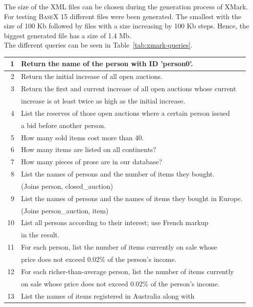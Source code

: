 The size of the XML files can be chosen during the generation process of XMark.
For testing \textsc{BaseX} 15 different files were been generated.
The smallest with the size of 100 Kb followed by files with a size increasing by 100 Kb steps.
Hence, the biggest generated file has a size of 1.4 Mb.\\
The different queries can be seen in Table~\ref{tab:xmark-queries}.
\begin {table}[htpb] 
  \centering
	\begin{tabular}{r|l}
	  \hline
	  1&Return the name of the person with ID 'person0'.\\
	  \hline
	  2&Return the initial increase of all open auctions.\\
	  \hline
	  3&Return the first and current increase of all open auctions whose current\\
	  &increase is at least twice as high as the initial increase.\\
	  \hline
	  4&List the reserves of those open auctions where a certain person issued\\
	  &a bid before another person.\\
	  \hline
	  5&How many sold items cost more than 40.\\
	  \hline
	  6&How many items are listed on all continents?\\
	  \hline
	  7&How many pieces of prose are in our database?\\
	  \hline
	  8&List the names of persons and the number of items they bought.\\
	  &(Joins person, closed\_auction)\\
	  \hline
	  9&List the names of persons and the names of items they bought in Europe.\\
	  &(Joins person\_auction, item)\\
	  \hline
	  10&List all persons according to their interest; use French markup\\
	  &in the result.\\
	  \hline
	  11&For each person, list the number of items currently on sale whose\\
	  &price does not exceed 0.02\% of the person's income.\\
	  \hline
	  12&For each richer-than-average person, list the number of items currently\\
	  &on sale whose price does not exceed 0.02\% of the person's income.\\
	  \hline
	  13&List the names of items registered in Australia along with\\

\end{tabular}
\end{table}
